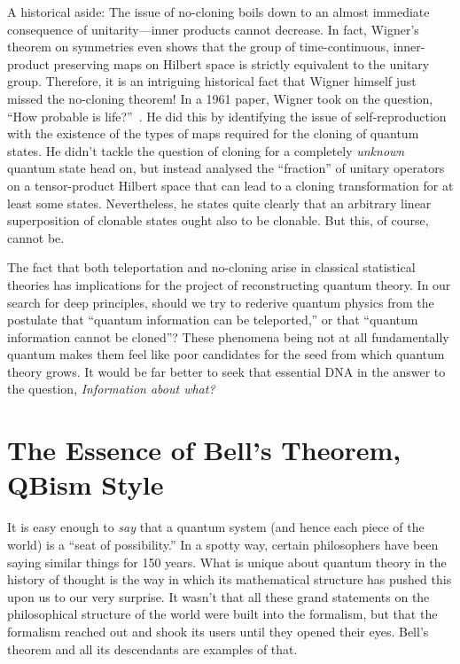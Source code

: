 \documentclass[aps,pra,superscriptaddress,12pt,tightenlines,nofootinbib]{revtex4-2}
\begin{document}
A historical aside:  The issue of no-cloning boils down to an almost immediate consequence of unitarity---inner products cannot decrease.  In fact, Wigner's theorem on symmetries \cite{Wigner12} even shows that the group of time-continuous, inner-product preserving maps on Hilbert space is strictly equivalent to the unitary group.  Therefore, it is an intriguing historical fact that Wigner himself just missed the no-cloning theorem!  In a 1961 paper, Wigner took on the question, ``How probable is life?''~\cite{Wigner61}. He did this by identifying the issue of self-reproduction with the existence of the types of maps required for the cloning of quantum states.  He didn't tackle the question of cloning for a completely {\it unknown\/} quantum state head on, but instead analysed the ``fraction'' of unitary operators on a tensor-product Hilbert space that can lead to a cloning transformation for at least some states.  Nevertheless, he states quite clearly that an arbitrary linear superposition of clonable states ought also to be clonable. But this, of course, cannot be.

The fact that both teleportation and no-cloning arise in classical statistical theories has implications for the project of reconstructing quantum theory.  In our search for deep principles, should we try to rederive quantum physics from the postulate that ``quantum information can be teleported,'' or that ``quantum information cannot be cloned''?  These phenomena being not at all fundamentally quantum makes them feel like poor candidates for the seed from which quantum theory grows.  It would be far better to seek that essential DNA in the answer to the question, {\it Information about what?}

\section{The Essence of Bell's Theorem, QBism Style}

\label{BellTheorem}

It is easy enough to {\it say\/} that a quantum system (and hence each piece of the world) is a ``seat of possibility.''  In a spotty way, certain philosophers have been saying similar things for 150 years.  What is unique about quantum theory in the history of thought is the way in which its mathematical structure has pushed this upon us to our very surprise.  It wasn't that all these grand statements on the philosophical structure of the world were built into the formalism, but that the formalism reached out and shook its users until they opened their eyes.  Bell's theorem and all its descendants are examples of that.
\end{document}
